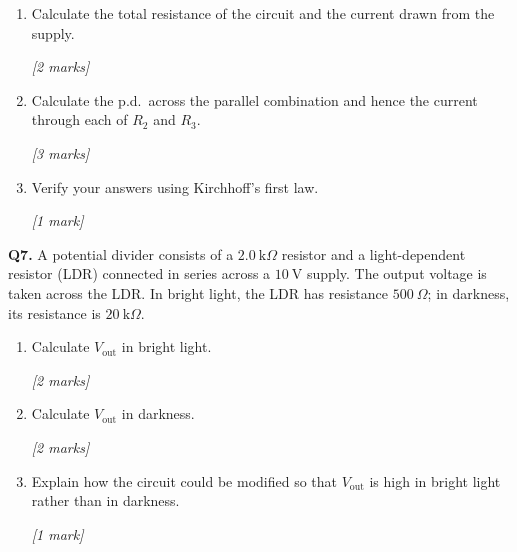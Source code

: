 \begin{tcolorbox}[colback=white, colframe=midblue, breakable]
\begin{minipage}{\linewidth}
\begin{enumerate}[label=(\alph*)]
  \item Calculate the total resistance of the circuit and the current drawn from the supply.
  \par\hfill\textit{[2 marks]}
  \vspace{2.5cm}

  \item Calculate the p.d.\ across the parallel combination and hence the current through each of $R_2$ and $R_3$.
  \par\hfill\textit{[3 marks]}
  \vspace{3.5cm}

  \item Verify your answers using Kirchhoff's first law.
  \par\hfill\textit{[1 mark]}
  \vspace{2cm}
\end{enumerate}
\end{minipage}

\begin{minipage}{\linewidth}
\textbf{Q7.} A potential divider consists of a $2.0\ \text{k}\Omega$ resistor and a light-dependent resistor (LDR) connected in series across a $10\ \text{V}$ supply. The output voltage is taken across the LDR. In bright light, the LDR has resistance $500\ \Omega$; in darkness, its resistance is $20\ \text{k}\Omega$.

\begin{enumerate}[label=(\alph*)]
  \item Calculate $V_{\text{out}}$ in bright light.
  \par\hfill\textit{[2 marks]}
  \vspace{2.5cm}

  \item Calculate $V_{\text{out}}$ in darkness.
  \par\hfill\textit{[2 marks]}
  \vspace{2.5cm}

  \item Explain how the circuit could be modified so that $V_{\text{out}}$ is high in bright light rather than in darkness.
  \par\hfill\textit{[1 mark]}
  \vspace{2.5cm}
\end{enumerate}
\end{minipage}

\end{tcolorbox}


\pagebreak

